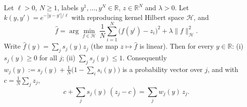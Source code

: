 %

\begin{lemma}[Positivity of the exponential-kernel learner, $k=1$]
Let $\ell>0$, $N\ge1$, labels $y^1,\dots,y^N\in\mathbb R$, $z\in\mathbb R^N$ and $\lambda>0$.
Let $k(y,y')=e^{-|y-y'|/\ell}$ with reproducing kernel Hilbert space $\mathcal H$, and
\[
\hat f=\arg\min_{f\in\mathcal H}\ \frac1N\sum_{i=1}^N\big(f(y^i)-z_i\big)^2+\lambda\|f\|_{\mathcal H}^2 .
\]
Write $\hat f(y)=\sum_j s_j(y)z_j$ (the map $z\mapsto\hat f$ is linear). Then for every $y\in\mathbb R$:
(i) $s_j(y)\ge0$ for all $j$; (ii) $\sum_js_j(y)\le1$. Consequently
$w_j(y):=s_j(y)+\frac1N\big(1-\sum_is_i(y)\big)$ is a probability vector over $j$, and with
$c=\frac1N\sum_jz_j$,
\[
c+\sum_js_j(y)\,(z_j-c)=\sum_jw_j(y)\,z_j .
\]
\end{lemma}


